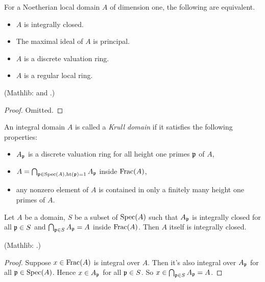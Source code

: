 \begin{prop}
\label{noeth-local-domain-is-icd-iff}
\leanok
For a Noetherian local domain $A$ of dimension one, the following are equivalent.
\begin{itemize}
\item
$A$ is integrally closed.
\item
The maximal ideal of $A$ is principal.
\item
$A$ is a discrete valuation ring.
\item
$A$ is a regular local ring.
\end{itemize}
(Mathlib:  and
.)
\end{prop}

\begin{proof}
\leanok
Omitted.
\end{proof}

\begin{definition}
\label{krull-domain-defn}
\leanok
An integral domain $A$ is called a \emph{Krull domain}
if it satisfies the following properties:
\begin{itemize}
\item
$A_{\mathfrak{p}}$ is a discrete valuation ring for all height one primes ${\mathfrak{p}}$ of $A$,
\item
$A=\bigcap_{{\mathfrak{p}}\in{\mathrm{Spec}}(A),{\mathrm{ht}}({\mathfrak{p}})=1}A_{\mathfrak{p}}$ inside ${\mathrm{Frac}}(A)$,
\item
any nonzero element of $A$ is contained in only a finitely many height one primes of $A$.
\end{itemize}
\end{definition}


\begin{lem}
\label{integrally-closed-is-local-prop}
\leanok
Let $A$ be a domain, $S$ be a subset of ${\mathrm{Spec}}(A)$
such that $A_{\mathfrak{p}}$ is integrally closed for all ${\mathfrak{p}}\in S$
and $\bigcap_{{\mathfrak{p}}\in S}A_{\mathfrak{p}}=A$ inside ${\mathrm{Frac}}(A)$.
Then $A$ itself is integrally closed.

(Mathlib: .)
\end{lem}

\begin{proof}
\leanok
Suppose $x\in{\mathrm{Frac}}(A)$ is integral over $A$. Then it's also integral over $A_{\mathfrak{p}}$
for all ${\mathfrak{p}}\in{\mathrm{Spec}}(A)$. Hence $x\in A_{\mathfrak{p}}$ for all ${\mathfrak{p}}\in S$.
So $x\in\bigcap_{{\mathfrak{p}}\in S}A_{\mathfrak{p}}=A$.
\end{proof}

